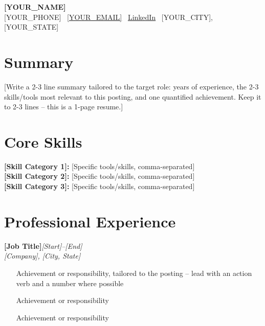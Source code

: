 \documentclass[10.5pt,letterpaper]{article}
\newcommand{\cvheader}[3]{%
  \noindent\textbf{#1}\hfill\textit{#3}\\
  \textit{#2}
}
\begin{document}
\begin{center}
  {\LARGE\bfseries\color{accent} [YOUR_NAME]}\\[2pt]
  [YOUR_PHONE] \textbar\ \href{mailto:[YOUR_EMAIL]}{[YOUR_EMAIL]} \textbar\ \href{[YOUR_LINKEDIN_URL]}{LinkedIn} \textbar\ [YOUR_CITY], [YOUR_STATE]
\end{center}

\section{Summary}
[Write a 2-3 line summary tailored to the target role: years of experience, the 2-3 skills/tools most relevant to this posting, and one quantified achievement. Keep it to 2-3 lines -- this is a 1-page resume.]

\section{Core Skills}
\textbf{[Skill Category 1]:} [Specific tools/skills, comma-separated] \\
\textbf{[Skill Category 2]:} [Specific tools/skills, comma-separated] \\
\textbf{[Skill Category 3]:} [Specific tools/skills, comma-separated]

\section{Professional Experience}

\cvheader{[Job Title]}{[Company], [City, State]}{[Start]--[End]}
\begin{itemize}
  \item [Achievement or responsibility, tailored to the posting -- lead with an action verb and a number where possible]
  \item [Achievement or responsibility]
  \item [Achievement or responsibility]
\end{itemize}
\end{document}
